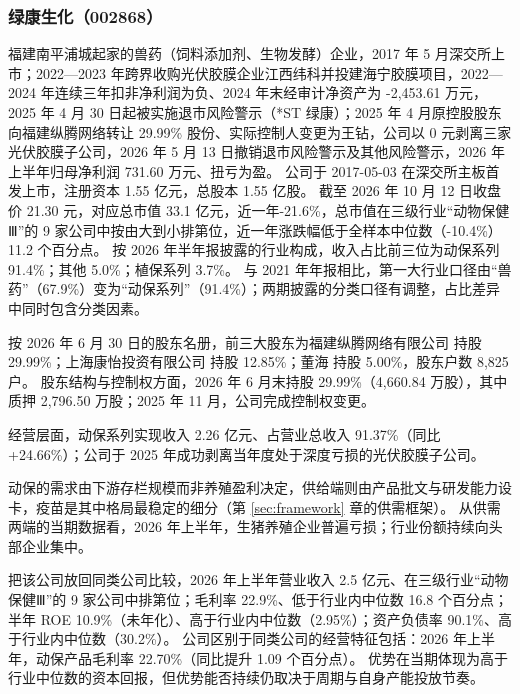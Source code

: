 \subsubsection{绿康生化（002868）}
\label{co:002868}

 福建南平浦城起家的兽药（饲料添加剂、生物发酵）企业，2017 年 5 月深交所上市；2022—2023 年跨界收购光伏胶膜企业江西纬科并投建海宁胶膜项目，2022—2024 年连续三年扣非净利润为负、2024 年末经审计净资产为 -2,453.61 万元，2025 年 4 月 30 日起被实施退市风险警示（*ST 绿康）；2025 年 4 月原控股股东向福建纵腾网络转让 29.99\% 股份、实际控制人变更为王钻，公司以 0 元剥离三家光伏胶膜子公司，2026 年 5 月 13 日撤销退市风险警示及其他风险警示，2026 年上半年归母净利润 731.60 万元、扭亏为盈。 公司于 2017-05-03 在深交所主板首发上市，注册资本 1.55 亿元，总股本 1.55 亿股。 截至 2026 年 10 月 12 日收盘价 21.30 元，对应总市值 33.1 亿元，近一年-21.6\%，总市值在三级行业“动物保健Ⅲ”的 9 家公司中按由大到小排第位，近一年涨跌幅低于全样本中位数（-10.4\%）11.2 个百分点。 按 2026 年半年报披露的行业构成，收入占比前三位为动保系列 91.4\%；其他 5.0\%；植保系列 3.7\%。 与 2021 年年报相比，第一大行业口径由“兽药”（67.9\%）变为“动保系列”（91.4\%）；两期披露的分类口径有调整，占比差异中同时包含分类因素。

 按 2026 年 6 月 30 日的股东名册，前三大股东为福建纵腾网络有限公司 持股 29.99\%；上海康怡投资有限公司 持股 12.85\%；董海 持股 5.00\%，股东户数 8,825 户。 股东结构与控制权方面，2026 年 6 月末持股 29.99\%（4,660.84 万股），其中质押 2,796.50 万股；2025 年 11 月，公司完成控制权变更。

 经营层面，动保系列实现收入 2.26 亿元、占营业总收入 91.37\%（同比+24.66\%）；公司于 2025 年成功剥离当年度处于深度亏损的光伏胶膜子公司。

 动保的需求由下游存栏规模而非养殖盈利决定，供给端则由产品批文与研发能力设卡，疫苗是其中格局最稳定的细分（第 \ref{sec:framework} 章的供需框架）。 从供需两端的当期数据看，2026 年上半年，生猪养殖企业普遍亏损；行业份额持续向头部企业集中。

 把该公司放回同类公司比较，2026 年上半年营业收入 2.5 亿元、在三级行业“动物保健Ⅲ”的 9 家公司中排第位；毛利率 22.9\%、低于行业内中位数 16.8 个百分点；半年 ROE 10.9\%（未年化）、高于行业内中位数（2.95\%）；资产负债率 90.1\%、高于行业内中位数（30.2\%）。 公司区别于同类公司的经营特征包括：2026 年上半年，动保产品毛利率 22.70\%（同比提升 1.09 个百分点）。 优势在当期体现为高于行业中位数的资本回报，但优势能否持续仍取决于周期与自身产能投放节奏。


